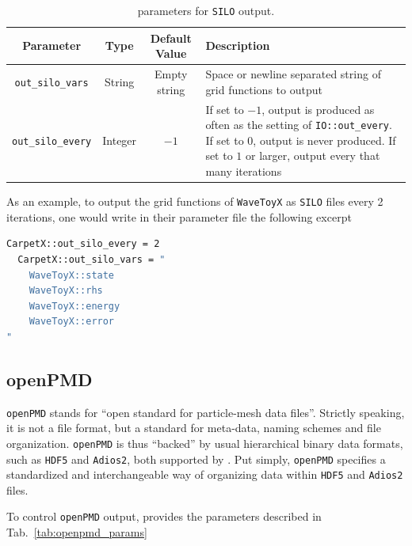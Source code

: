 \begin{table}[ht]
  \centering
  \begin{tabularx}{\textwidth}{cccX}
    Parameter                 & Type    & Default Value  & Description \\\hline\hline
    \texttt{out\_silo\_vars}  & String  & Empty string   & Space or newline separated string of grid functions to output \\
    \texttt{out\_silo\_every} & Integer & $-1$           & If set to $-1$, output is produced as often as the setting of \texttt{IO::out\_every}. If set to $0$, output is never produced. If set to $1$ or larger, output every that many iterations \\\hline\hline
  \end{tabularx}
  \label{tab:silo_params}
  \caption{\CarpetX\space parameters for \texttt{SILO} output.}
\end{table}

As an example, to output the grid functions of \texttt{WaveToyX} as \texttt{SILO} files every 2 iterations, one would write in their parameter file the following excerpt

\begin{lstlisting}[language=bash]
  CarpetX::out_silo_every = 2
  CarpetX::out_silo_vars = "
    WaveToyX::state
    WaveToyX::rhs
    WaveToyX::energy
    WaveToyX::error
"
\end{lstlisting}

\subsection{openPMD}
\label{sec:openpmd}

\texttt{openPMD} stands for ``open standard for particle-mesh data files''. Strictly speaking, it is not a file format, but a standard for meta-data, naming schemes and file organization. \texttt{openPMD} is thus ``backed'' by usual hierarchical binary data formats, such as \texttt{HDF5} and \texttt{Adios2}, both supported by \CarpetX. Put simply, \texttt{openPMD} specifies a standardized and interchangeable way of organizing data within \texttt{HDF5} and \texttt{Adios2} files.

To control \texttt{openPMD} output, \CarpetX\space provides the parameters described in Tab.~\ref{tab:openpmd_params}


